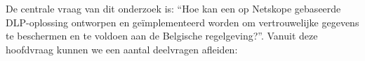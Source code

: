 
\section{}%
\label{sec:onderzoeksvraag}

De centrale vraag van dit onderzoek is: “Hoe kan een op Netskope gebaseerde DLP-oplossing ontworpen en geïmplementeerd worden om vertrouwelijke gegevens te beschermen en te voldoen aan de Belgische regelgeving?”. 
Vanuit deze hoofdvraag kunnen we een aantal deelvragen afleiden:

